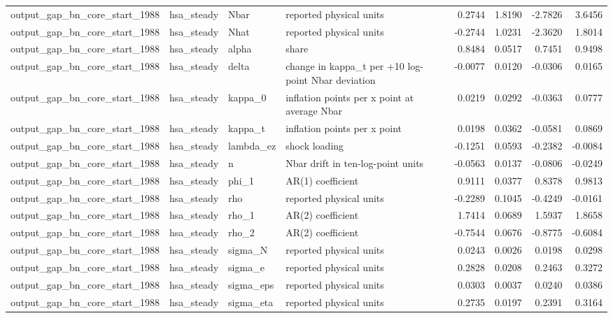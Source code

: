 \begin{tabular}{llllrrrr}
output\_gap\_bn\_core\_start\_1988 & hsa\_steady & Nbar & reported physical units & 0.2744 & 1.8190 & -2.7826 & 3.6456 \\
output\_gap\_bn\_core\_start\_1988 & hsa\_steady & Nhat & reported physical units & -0.2744 & 1.0231 & -2.3620 & 1.8014 \\
output\_gap\_bn\_core\_start\_1988 & hsa\_steady & alpha & share & 0.8484 & 0.0517 & 0.7451 & 0.9498 \\
output\_gap\_bn\_core\_start\_1988 & hsa\_steady & delta & change in kappa\_t per +10 log-point Nbar deviation & -0.0077 & 0.0120 & -0.0306 & 0.0165 \\
output\_gap\_bn\_core\_start\_1988 & hsa\_steady & kappa\_0 & inflation points per x point at average Nbar & 0.0219 & 0.0292 & -0.0363 & 0.0777 \\
output\_gap\_bn\_core\_start\_1988 & hsa\_steady & kappa\_t & inflation points per x point & 0.0198 & 0.0362 & -0.0581 & 0.0869 \\
output\_gap\_bn\_core\_start\_1988 & hsa\_steady & lambda\_ez & shock loading & -0.1251 & 0.0593 & -0.2382 & -0.0084 \\
output\_gap\_bn\_core\_start\_1988 & hsa\_steady & n & Nbar drift in ten-log-point units & -0.0563 & 0.0137 & -0.0806 & -0.0249 \\
output\_gap\_bn\_core\_start\_1988 & hsa\_steady & phi\_1 & AR(1) coefficient & 0.9111 & 0.0377 & 0.8378 & 0.9813 \\
output\_gap\_bn\_core\_start\_1988 & hsa\_steady & rho & reported physical units & -0.2289 & 0.1045 & -0.4249 & -0.0161 \\
output\_gap\_bn\_core\_start\_1988 & hsa\_steady & rho\_1 & AR(2) coefficient & 1.7414 & 0.0689 & 1.5937 & 1.8658 \\
output\_gap\_bn\_core\_start\_1988 & hsa\_steady & rho\_2 & AR(2) coefficient & -0.7544 & 0.0676 & -0.8775 & -0.6084 \\
output\_gap\_bn\_core\_start\_1988 & hsa\_steady & sigma\_N & reported physical units & 0.0243 & 0.0026 & 0.0198 & 0.0298 \\
output\_gap\_bn\_core\_start\_1988 & hsa\_steady & sigma\_e & reported physical units & 0.2828 & 0.0208 & 0.2463 & 0.3272 \\
output\_gap\_bn\_core\_start\_1988 & hsa\_steady & sigma\_eps & reported physical units & 0.0303 & 0.0037 & 0.0240 & 0.0386 \\
output\_gap\_bn\_core\_start\_1988 & hsa\_steady & sigma\_eta & reported physical units & 0.2735 & 0.0197 & 0.2391 & 0.3164 \\

\end{tabular}

